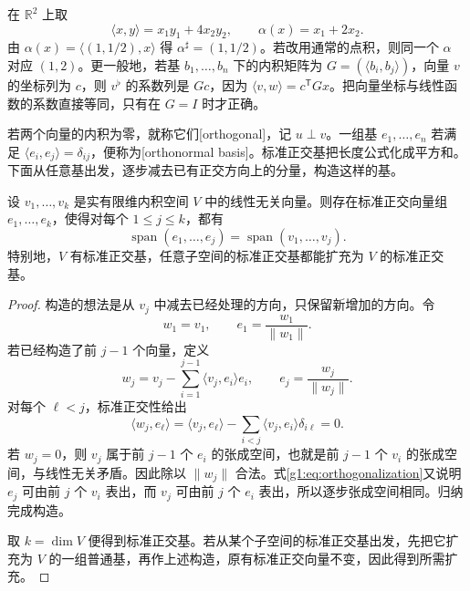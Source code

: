\begin{example}
	\label{g1:exm:metric-dual}
	在 \(\mathbb R^2\) 上取
	\[
		\langle x,y\rangle=x_1y_1+4x_2y_2,\qquad
		\alpha(x)=x_1+2x_2.
	\]
	由 \(\alpha(x)=\langle(1,1/2),x\rangle\) 得 \(\alpha^\sharp=(1,1/2)\)。若改用通常的点积，则同一个 \(\alpha\) 对应 \((1,2)\)。更一般地，若基 \(b_1,\ldots,b_n\) 下的内积矩阵为 \(G=(\langle b_i,b_j\rangle)\)，向量 \(v\) 的坐标列为 \(c\)，则 \(v^\flat\) 的系数列是 \(Gc\)，因为 \(\langle v,w\rangle=c^{\mathsf T}Gx\)。把向量坐标与线性函数的系数直接等同，只有在 \(G=I\) 时才正确。
\end{example}

若两个向量的内积为零，就称它们[orthogonal]，记 \(u\perp v\)。一组基 \(e_1,\ldots,e_n\) 若满足 \(\langle e_i,e_j\rangle=\delta_{ij}\)，便称为[orthonormal basis]。标准正交基把长度公式化成平方和。下面从任意基出发，逐步减去已有正交方向上的分量，构造这样的基。

\begin{proposition}
	\label{g1:prop:orthonormalization}
	设 \(v_1,\ldots,v_k\) 是实有限维内积空间 \(V\) 中的线性无关向量。则存在标准正交向量组 \(e_1,\ldots,e_k\)，使得对每个 \(1\leq j\leq k\)，都有
	\[
		\operatorname{span}(e_1,\ldots,e_j)
		=\operatorname{span}(v_1,\ldots,v_j).
	\]
	特别地，\(V\) 有标准正交基，任意子空间的标准正交基都能扩充为 \(V\) 的标准正交基。
\end{proposition}

\begin{proof}
	构造的想法是从 \(v_j\) 中减去已经处理的方向，只保留新增加的方向。令
	\[
		w_1=v_1,\qquad e_1=\frac{w_1}{\lVert w_1\rVert}.
	\]
	若已经构造了前 \(j-1\) 个向量，定义
	\begin{equation}
		\label{g1:eq:orthogonalization}
		w_j=v_j-\sum_{i=1}^{j-1}\langle v_j,e_i\rangle e_i,
		\qquad e_j=\frac{w_j}{\lVert w_j\rVert}.
	\end{equation}
	对每个 \(\ell<j\)，标准正交性给出
	\[
		\langle w_j,e_\ell\rangle
		=\langle v_j,e_\ell\rangle
		-\sum_{i<j}\langle v_j,e_i\rangle\delta_{i\ell}=0.
	\]
	若 \(w_j=0\)，则 \(v_j\) 属于前 \(j-1\) 个 \(e_i\) 的张成空间，也就是前 \(j-1\) 个 \(v_i\) 的张成空间，与线性无关矛盾。因此除以 \(\lVert w_j\rVert\) 合法。式\eqref{g1:eq:orthogonalization}又说明 \(e_j\) 可由前 \(j\) 个 \(v_i\) 表出，而 \(v_j\) 可由前 \(j\) 个 \(e_i\) 表出，所以逐步张成空间相同。归纳完成构造。

	取 \(k=\dim V\) 便得到标准正交基。若从某个子空间的标准正交基出发，先把它扩充为 \(V\) 的一组普通基，再作上述构造，原有标准正交向量不变，因此得到所需扩充。
\end{proof}

